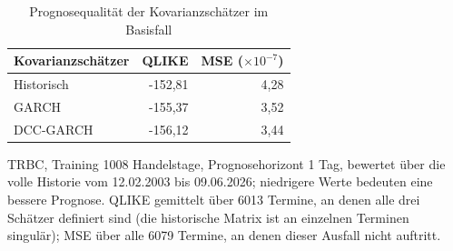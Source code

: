 \begin{table}[htbp]
  \centering
  \footnotesize
  \begin{tabular}{lrr}
    \toprule
    Kovarianzschätzer & QLIKE & MSE ($\times 10^{-7}$) \\
    \midrule
    Historisch & -152,81 & 4,28 \\
    GARCH & -155,37 & 3,52 \\
    DCC-GARCH & -156,12 & 3,44 \\
    \bottomrule
  \end{tabular}
  \caption{Prognosequalität der Kovarianzschätzer im Basisfall}
  \label{tab:statistik_basis}
  \begin{minipage}{\linewidth}\vspace{0.4em}\centering\footnotesize
  TRBC, Training 1008 Handelstage, Prognosehorizont 1 Tag, bewertet über die volle Historie vom 12.02.2003 bis 09.06.2026; niedrigere Werte bedeuten eine bessere Prognose. QLIKE gemittelt über 6013 Termine, an denen alle drei Schätzer definiert sind (die historische Matrix ist an einzelnen Terminen singulär); MSE über alle 6079 Termine, an denen dieser Ausfall nicht auftritt.
  \end{minipage}
\end{table}
